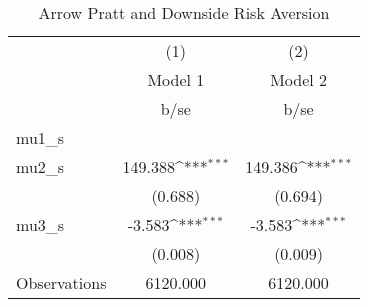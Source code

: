 \begin{table}[htbp]\centering
\def\sym#1{\ifmmode^{#1}\else\(^{#1}\)\fi}
\caption{Arrow Pratt and Downside Risk Aversion}
\begin{tabular}{l*{2}{c}}
\toprule
                &\multicolumn{1}{c}{(1)}&\multicolumn{1}{c}{(2)}\\
                &\multicolumn{1}{c}{Model 1}&\multicolumn{1}{c}{Model 2}\\
                &     b/se         &     b/se         \\
\midrule
mu1\_s           &                  &                  \\
mu2\_s           &  149.388\sym{***}&  149.386\sym{***}\\
                &  (0.688)         &  (0.694)         \\
mu3\_s           &   -3.583\sym{***}&   -3.583\sym{***}\\
                &  (0.008)         &  (0.009)         \\
\midrule
Observations    & 6120.000         & 6120.000         \\
\bottomrule
\end{tabular}
\end{table}
